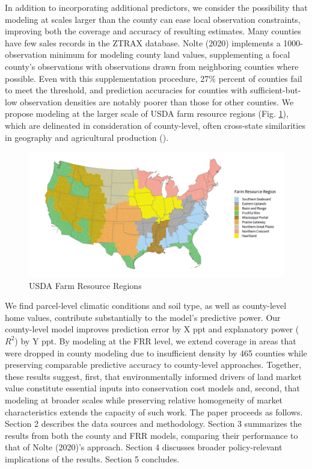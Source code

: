 \documentclass[12pt]{article}
\begin{document}
In addition to incorporating additional predictors, we consider the possibility that modeling at scales larger than the county can ease local observation constraints, improving both the coverage and accuracy of resulting estimates. Many counties have few sales records in the ZTRAX database. Nolte (2020) implements a 1000-observation minimum for modeling county land values, supplementing a focal county’s observations with observations drawn from neighboring counties where possible. Even with this supplementation procedure, 27\% percent of counties fail to meet the threshold, and prediction accuracies for counties with sufficient-but-low observation densities are notably poorer than those for other counties. We propose modeling at the larger scale of USDA farm resource regions (Fig. \ref{fig:FRR_map}), which are delineated in consideration of county-level, often cross-state similarities in geography and agricultural production (\cite{FRR2000}).

\begin{figure}
    \centering
    \includegraphics[width=1\textwidth]{exhibits/FRR_map.png}
    \caption{USDA Farm Resource Regions}
    \label{fig:FRR_map}
\end{figure}

We find parcel-level climatic conditions and soil type, as well as county-level home values, contribute substantially to the model's predictive power. Our county-level model improves prediction error by X ppt and explanatory power ($R^2$) by Y ppt. By modeling at the FRR level, we extend coverage in areas that were dropped in county modeling due to insufficient density by 465 counties while preserving comparable predictive accuracy to county-level approaches. Together, these results suggest, first, that environmentally informed drivers of land market value constitute essential inputs into conservation cost models and, second, that modeling at broader scales while preserving relative homogeneity of market characteristics extends the capacity of such work. The paper proceeds as follows. Section 2 describes the data sources and methodology. Section 3 summarizes the results from both the county and FRR models, comparing their performance to that of Nolte (2020)'s approach. Section 4 discusses broader policy-relevant implications of the results. Section 5 concludes.
\end{document}
